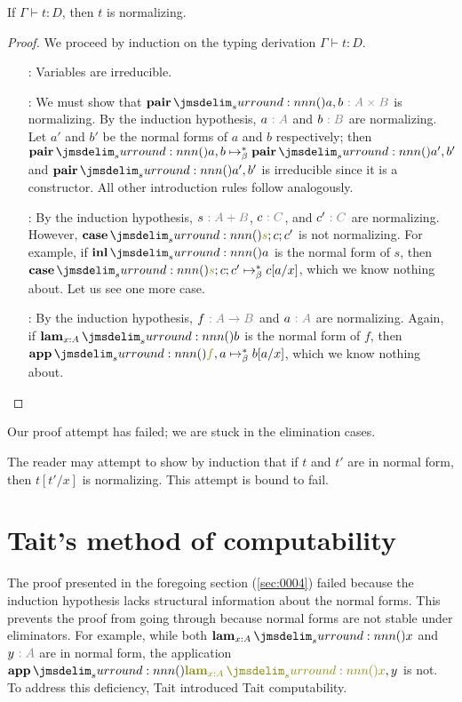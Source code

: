 \documentclass[a4paper]{article}
\begin{document}
\begin{theorem}\label{0003}
  If $\Gamma \vdash t : D$, then $t$ is normalizing.
\end{theorem}
\begin{proof}
  We proceed by induction on the typing derivation $\Gamma \vdash t : D$.
  \begin{itemize}
  \item[\rVar:] Variables are irreducible.
  \item[\rProdI:] We must show that $\tmPair{a}{b}\tpAnno{A \times B}$ is normalizing.
    By the induction hypothesis, $a\tpAnno{A}$ and $b\tpAnno{B}$ are normalizing.
    Let $a'$ and $b'$ be the normal forms of $a$ and $b$ respectively; then $\tmPair{a}{b} \bRed* \tmPair{a'}{b'}$ and $\tmPair{a'}{b'}$ is irreducible since it is a constructor.
    All other introduction rules follow analogously.
  \item[\rSumE:] By the induction hypothesis, $s\tpAnno{A + B}$, $c\tpAnno{C}$, and $c'\tpAnno{C}$ are normalizing.
    However, $\tmCase{s}{c}{c'}$ is not \apriori normalizing.
    For example, if $\tmInl{a}$ is the normal form of $s$, then $\tmCase{s}{c}{c'} \bRed* c[a/x]$, which we know nothing about.
    Let us see one more case.
  \item[\rFunE:] By the induction hypothesis, $f\tpAnno{A \to B}$ and $a\tpAnno{A}$ are normalizing.
    Again, if $\tmLam{x : A}{b}$ is the normal form of $f$, then $\tmApp{f}{a} \bRed* b[a/x]$, which we know nothing about.
  \end{itemize}
\end{proof}

Our proof attempt has failed; we are stuck in the elimination cases.

\begin{remark}
  The reader may attempt to show by induction that if $t$ and $t'$ are in normal form, then $t[t'/x]$ is normalizing.
  This attempt is bound to fail.
\end{remark}

\section{Tait's method of computability}
\label{sec:0006}

The proof presented in the foregoing section (\cref{sec:0004}) failed because the induction hypothesis lacks structural information about the normal forms.
This prevents the proof from going through because normal forms are not stable under eliminators.
For example, while both $\tmLam{x : A}{x}$ and $y\tpAnno{A}$ are in normal form, the application $\tmApp{\tmLam{x : A}{x}}{y}$ is not.
To address this deficiency, Tait introduced Tait computability.
\end{document}
